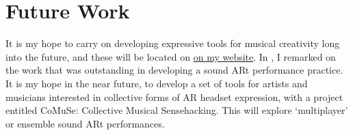 \section{Future Work} \label{sec: conclusion-futurework}
It is my hope to carry on developing expressive tools for musical creativity long into the future, and these will be located on \href{https://sambilbow.com}{on my website}. In \textit{}, I remarked on the work that was outstanding in developing a sound ARt performance practice. It is my hope in the near future, to develop a set of tools for artists and musicians interested in collective forms of AR headset expression, with a project entitled CoMuSe: Collective Musical Sensehacking. This will explore `multiplayer' or ensemble sound ARt performances.
